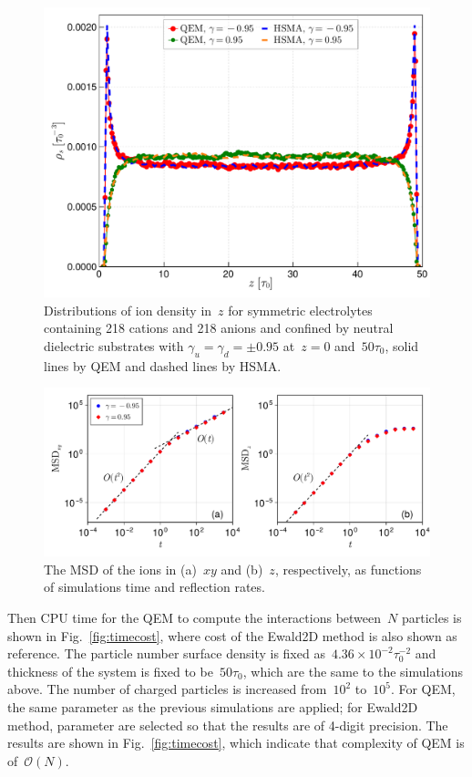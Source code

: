\begin{figure}[htbp]
    \centering
    \includegraphics[width = 0.8 \linewidth]{figs/compare_HSMA.pdf}
    \caption{
        Distributions of ion density in~$z$ for symmetric electrolytes containing 218 cations and 218 anions and confined by neutral dielectric substrates with $\gamma_u = \gamma_d = \pm 0.95$ at~$z = 0$ and~$50\tau_0$, solid lines by QEM and dashed lines by HSMA.
    }
    \label{fig:MD}
\end{figure}

\begin{figure}[htbp]
    \centering
    \includegraphics[width = 1.0 \linewidth]{figs/msd.pdf}
    \caption{
        The MSD of the ions in (a)~$xy$ and (b)~$z$, respectively, as functions of simulations time and reflection rates.
    }
    \label{fig:msd}
\end{figure}

Then CPU time for the QEM to compute the interactions between~$N$ particles is shown in Fig.~\ref{fig:timecost}, where cost of the Ewald2D method is also shown as reference.
The particle number surface density is fixed as~$4.36 \times 10^{-2} \tau_0^{-2}$ and thickness of the system is fixed to be~$50 \tau_0$, which are the same to the simulations above.
The number of charged particles is increased from~$10^2$ to~$10^5$.
For QEM, the same parameter as the previous simulations are applied; for Ewald2D method, parameter are selected so that the results are of 4-digit precision.
The results are shown in Fig.~\ref{fig:timecost}, which indicate that complexity of QEM is of~$\mathcal{O}(N)$.

